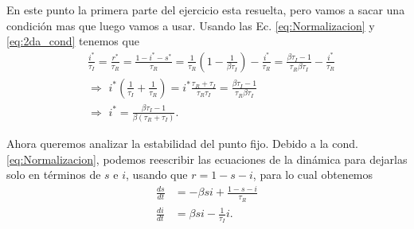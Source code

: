 En este punto la primera parte del ejercicio esta resuelta, pero vamos a sacar una condición mas que luego vamos a usar. Usando las Ec. \ref{eq:Normalizacion} y \ref{eq:2da_cond} tenemos que
\begin{eqnarray}
    &\frac{i^*}{\tau_I} = \frac{r^*}{\tau_R} = \frac{1-i^*-s^*}{\tau_R} = \frac{1}{\tau_R}\left(1-\frac{1}{\beta \tau_I}\right) - \frac{i^*}{\tau_R} = \frac{\beta \tau_I-1}{\tau_R\beta \tau_I} - \frac{i^*}{\tau_R}\\
    & \Rightarrow\,\,  i^* \left(\frac{1}{\tau_I} + \frac{1}{\tau_R}  \right) = i^* \frac{\tau_R + \tau_I}{\tau_R  \tau_I} =\frac{\beta \tau_I-1}{\tau_R\beta \tau_I} \\
    & \Rightarrow\,\,  \boxed{i^* = \frac{\beta \tau_I-1}{\beta \left( \tau_R + \tau_I \right)}}.\label{eq:3ra_Cond}
\end{eqnarray}

Ahora queremos analizar la estabilidad del punto fijo. Debido a la cond. \ref{eq:Normalizacion}, podemos reescribir las ecuaciones de la dinámica para dejarlas solo en términos de $s$ e $i$, usando que $r=1-s-i$, para lo cual obtenemos
\begin{align}
    \frac{ds}{dt} &=  -\beta si + \frac{1-s-i}{\tau_{R}}\label{eq:s_2}\\
    \frac{di}{dt} &=  \beta si - \frac{1}{\tau_{I}}i \label{eq:i_2}.
\end{align}


